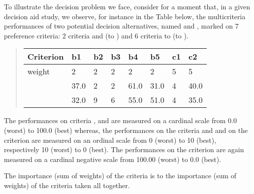 \documentclass[a4paper,10pt,english]{sphinxhowto}
\begin{document}
To illustrate the decision problem we face, consider for a moment that, in a given decision aid study, we observe, for instance in the Table below, the multi\sphinxhyphen{}criteria performances of two potential decision alternatives, named  and , marked on 7  preference criteria: 2  criteria  and  (to ) and 6  criteria  to  (to ).
\begin{quote}


\begin{savenotes}\sphinxattablestart
\centering
\begin{tabulary}{\linewidth}[t]{|T|T|T|T|T|T|T|T|}
\hline
\sphinxstyletheadfamily 
Criterion
&\sphinxstyletheadfamily 
b1
&\sphinxstyletheadfamily 
b2
&\sphinxstyletheadfamily 
b3
&\sphinxstyletheadfamily 
b4
&\sphinxstyletheadfamily 
b5
&\sphinxstyletheadfamily 
c1
&\sphinxstyletheadfamily 
c2
\\
\hline
weight
&
2
&
2
&
2
&
2
&
2
&
5
&
5
\\
\hline
{}
&
37.0
&
2
&
2
&
61.0
&
31.0
&
\sphinxhyphen{}4
&
\sphinxhyphen{}40.0
\\
\hline
{}
&
32.0
&
9
&
6
&
55.0
&
51.0
&
\sphinxhyphen{}4
&
\sphinxhyphen{}35.0
\\
\hline
\end{tabulary}
\par
\sphinxattableend\end{savenotes}
\end{quote}

The performances on  criteria ,  and  are measured on a cardinal scale from 0.0 (worst) to 100.0 (best) whereas, the performances on the  criteria  and   and on the  criterion  are measured on an ordinal scale from 0 (worst) to 10 (best), respectively \sphinxhyphen{}10 (worst) to 0 (best). The performances on the  criterion  are again measured on a cardinal negative scale from \sphinxhyphen{}100.00 (worst) to 0.0 (best).

The importance (sum of weights) of the  criteria is  to the importance (sum of weights) of the  criteria taken all together.
\end{document}
